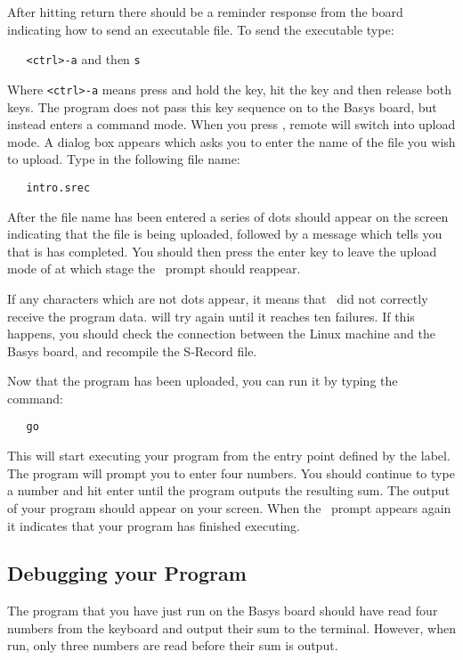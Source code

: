 After hitting return there should be a reminder response from the board indicating 
how to send an executable file. To send the executable type:

\verb|   <ctrl>-a| and then \verb|s|

Where \verb|<ctrl>-a| means press and hold the  key, hit 
the  key and then release both keys.
The  program does not pass this key sequence on to the Basys 
board, but instead enters a command mode. When you press , remote will
switch into upload mode. A dialog box appears which asks you to enter the name
of the file you wish to upload. Type in the following file name:
\begin{verbatim}
   intro.srec
\end{verbatim}

After the file name has been entered a series of dots should appear on the 
screen indicating that the file is being uploaded, followed by a message which
tells you that is has completed. You should then press the enter key to
leave the upload mode of  at which stage the \WRAMPmon\ prompt 
should reappear.

If any characters which are not dots appear, it means that \WRAMPmon\ did not
correctly receive the program data.  will try again until it
reaches ten failures. If this happens, you should check the connection between
the Linux machine and the Basys board, and recompile the S-Record file.

Now that the program has been uploaded, you can run it by typing the command:
\begin{verbatim}
   go
\end{verbatim}

This will start executing your program from the entry point defined by the 
 label. The program will prompt you to enter four numbers. You should continue to type a number and hit enter until the program outputs the resulting
sum. The output of your program should appear on your screen. When the \WRAMPmon\
prompt appears again it indicates that your program has finished executing.

\subsection{Debugging your Program}
The program that you have just run on the Basys board should have read four 
numbers from the keyboard and output their sum to the terminal. However, when
run, only three numbers are read before their sum is output.

